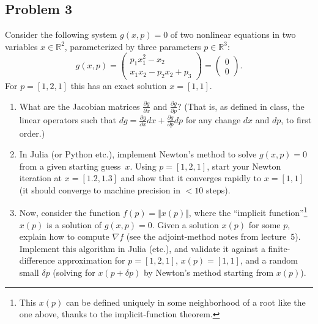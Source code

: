 \documentclass[10pt,oneside]{article}
\begin{document}
\subsection*{Problem 3}

Consider the following system $g(x,p)=0$ of two nonlinear equations
in two variables $x\in\mathbb{R}^{2}$, parameterized by three parameters
$p\in\mathbb{R}^{3}$:
\[
g(x,p)=\left(\begin{array}{c}
p_{1}x_{1}^{2}-x_{2}\\
x_{1}x_{2}-p_{2}x_{2}+p_{3}
\end{array}\right)=\left(\begin{array}{c}
0\\
0
\end{array}\right).
\]
For $p=[1,2,1]$ this has an exact solution $x=[1,1]$.
\begin{enumerate}
\item What are the Jacobian matrices $\frac{\partial g}{\partial x}$ and
$\frac{\partial g}{\partial p}$? (That is, as defined in class, the
linear operators such that $dg=\frac{\partial g}{\partial x}dx+\frac{\partial g}{\partial p}dp$
for any change $dx$ and $dp$, to first order.)
\item In Julia (or Python etc.), implement Newton's method to solve $g(x,p)=0$
from a given starting guess~$x$. Using $p=[1,2,1]$, start your
Newton iteration at $x=[1.2,1.3]$ and show that it converges rapidly
to $x=[1,1]$ (it should converge to machine precision in $<10$ steps).
\item Now, consider the function $f(p)=\Vert x(p)\Vert$, where the ``implicit
function''\footnote{This $x(p)$ can be defined uniquely in some neighborhood of a root
like the one above, thanks to the implicit-function theorem.} $x(p)$ is a solution of $g(x,p)=0$. Given a solution $x(p)$ for
some $p$, explain how to compute $\nabla f$ (see the adjoint-method
notes from lecture~5). Implement this algorithm in Julia (etc.),
and validate it against a finite-difference approximation for $p=[1,2,1]$,
$x(p)=[1,1]$, and a random small $\delta p$ (solving for $x(p+\delta p)$
by Newton's method starting from $x(p)$).
\end{enumerate}
\end{document}

